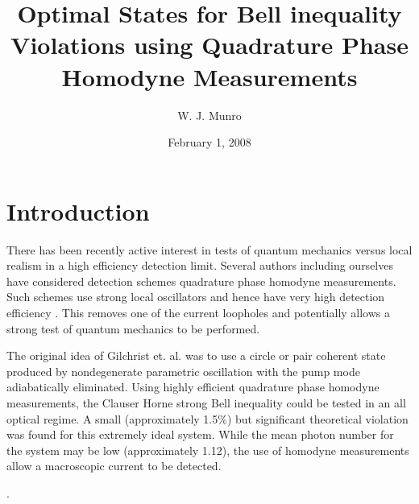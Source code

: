 \documentclass[aps,twocolumn,letter,10pt,floatfix]{revtex4}
\begin{document}
\title{Optimal States for Bell inequality Violations using Quadrature Phase Homodyne Measurements} 
\author{W. J. Munro}
\date{February 1, 2008}

\maketitle

\section{Introduction}
 
There has been recently active interest in tests of quantum mechanics \cite{epr} versus local realism in a high efficiency detection limit. Several authors \cite{apm,wg,bd} including ourselves have considered detection schemes quadrature phase homodyne measurements. Such schemes use strong local oscillators and hence have very high detection efficiency \cite{ejh}. This removes one of the current loopholes \cite{jmar,ppa,mpma,ets} and potentially allows a strong test of quantum mechanics to be performed.
 
The original idea of Gilchrist et. al. \cite{apm} was to use a circle or pair coherent state \cite{gs,kg,ml} produced by nondegenerate parametric oscillation with the pump mode adiabatically eliminated. Using highly efficient quadrature phase homodyne measurements, the Clauser Horne strong Bell inequality \cite{bell,jma,jfa} could be tested in an all optical regime. A small (approximately 1.5\%) but significant theoretical violation was found for this extremely ideal system. While the mean photon number for the system may be low (approximately 1.12), the use of homodyne measurements allow a macroscopic current to be detected.
 
 
.
 

 
\end{document}
